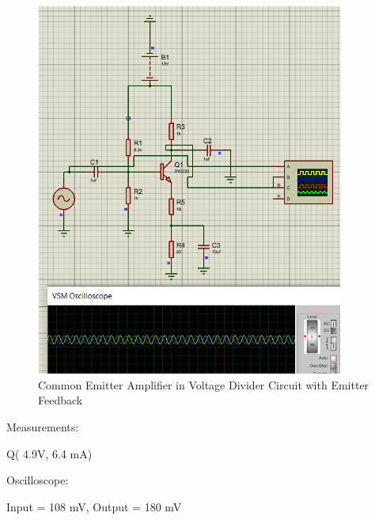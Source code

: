 \begin{figure}[H]
    \centering
    \includegraphics[width = 0.9\textwidth]{Imagenes/Imagenes_Santiago/6.PNG}
    \caption{Common Emitter Amplifier in Voltage Divider Circuit with Emitter Feedback}
    \label{circuit2Simulated}
\end{figure}

Measurements:
\begin{center}
    Q( 4.9V, 6.4 mA)
\end{center}

Oscilloscope:

\begin{center}
    Input = 108 mV, Output = 180 mV
\end{center}